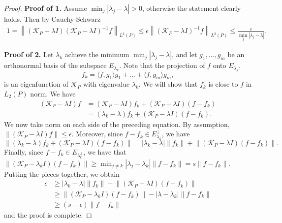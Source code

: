 \documentclass{article}
\newcommand{\norm}[1]{\left\lVert#1\right\rVert}
\newcommand{\abs}[1]{\left \lvert #1 \right \rvert}
\newcommand{\dotp}[2]{\langle #1, #2 \rangle}
\newcommand{\1}{\mathbb{I}}
\theoremstyle{alden}
\theoremstyle{aldenthm}
\theoremstyle{definition}
\theoremstyle{remark}
\begin{document}
\begin{proof}
	\item[]
	\textbf{Proof of 1.} Assume $\min_{j}\abs{\lambda_j - \lambda} > 0$, otherwise the statement clearly holds. Then by Cauchy-Schwarz
	\begin{align*}
	1 = \norm{(\mathcal{K}_P - \lambda I) (\mathcal{K}_P - \lambda I)^{-1} f}_{L^2(P)} \leq \epsilon \norm{(\mathcal{K}_P - \lambda I)^{-1} f}_{L^2(P)}  \leq \frac{\epsilon}{\min_{j}\abs{\lambda_j - \lambda}}.
	\end{align*}
	
	\textbf{Proof of 2.} Let $\lambda_k$ achieve the minimum $\min_{j}\abs{\lambda_j - \lambda}$, and let $g_1,\ldots,g_m$ be an orthonormal basis of the subspace $E_{\lambda_k}$. Note that the projection of $f$ onto $E_{\lambda_k}$,
	\begin{equation*}
	f_k = \dotp{f}{g_1}g_1 + \ldots + \dotp{f}{g_m}g_m,
	\end{equation*}
	is an eigenfunction of $\mathcal{K}_P$ with eigenvalue $\lambda_k$. We will show that $f_k$ is close to $f$ in $L_2(P)$ norm. We have
	\begin{align*}
	(\mathcal{K}_P - \lambda I) f & = (\mathcal{K}_P - \lambda I) f_k + (\mathcal{K}_P - \lambda I) (f - f_k) \\
	& = (\lambda_k - \lambda) f_k + (\mathcal{K}_P - \lambda I) (f - f_k).
	\end{align*}
	We now take norm on each side of the preceding equation. By assumption, $\norm{(\mathcal{K}_P - \lambda I) f} \leq \epsilon$. Moreover, since $f - f_k \in E_{\lambda_k}^{\perp}$, we have
	\begin{equation*}
	\norm{(\lambda_k - \lambda) f_k + (\mathcal{K}_P - \lambda I) (f - f_k)} = \abs{\lambda_k - \lambda} \norm{f_k} + \norm{(\mathcal{K}_P - \lambda I) (f - f_k)}.
	\end{equation*}
	Finally, since $f - f_k \in E_{\lambda_k^{\perp}}$, we have that $\norm{(\mathcal{K}_P - \lambda_k I) (f - f_k)} \geq \min_{j \neq k} \abs{\lambda_j - \lambda_k} \norm{f - f_k} = s \norm{f - f_k}$. Putting the pieces together, we obtain
	\begin{align*}
	\epsilon & \geq \abs{\lambda_k - \lambda} \norm{f_k} + \norm{(\mathcal{K}_P - \lambda I) (f - f_k)} \\
	& \geq \norm{(\mathcal{K}_P - \lambda_k I) (f - f_k)} - \abs{\lambda - \lambda_k} \norm{f - f_k} \\
	& \geq (s - \epsilon) \norm{f - f_k}
	\end{align*}
	and the proof is complete.
\end{proof}
\end{document}
